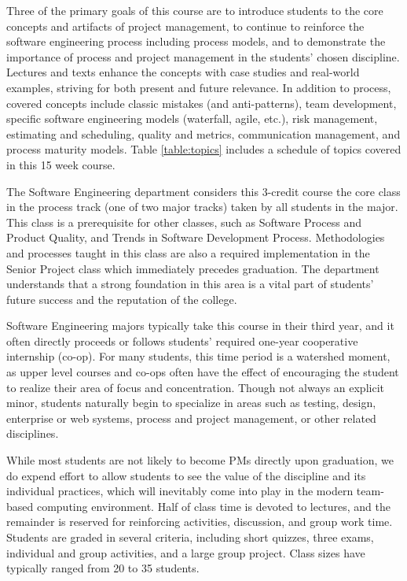 \documentclass{sig-alternate}
\begin{document}
Three of the primary goals of this course are to introduce students to the core concepts and artifacts of
project management, to continue to reinforce the software engineering process including process models,
and to demonstrate the importance of process and project management in the students' chosen discipline.
Lectures and texts enhance the concepts with case studies and real-world examples, striving for both
present and future relevance. In addition to process, covered concepts include classic mistakes (and
anti-patterns), team development, specific software engineering models (waterfall, agile, etc.), risk
management, estimating and scheduling, quality and metrics, communication management, and process
maturity models. Table \ref{table:topics} includes a schedule of topics covered in this 15 week course.

The Software Engineering department considers this 3-credit course the core class in the process track
(one of two major tracks) taken by all students in the major. This class is a prerequisite for other classes,
such as Software Process and Product Quality, and Trends in Software Development Process.
Methodologies and processes taught in this class are also a required implementation in the Senior Project
class which immediately precedes graduation. The department understands that a strong foundation in
this area is a vital part of students' future success and the reputation of the college.

Software Engineering majors typically take this course in their third year, and it often directly
proceeds or follows students' required one-year cooperative internship (co-op). For many students, this
time period is a watershed moment, as upper level courses and co-ops often have the effect of
encouraging the student to realize their area of focus and concentration. Though not always an explicit
minor, students naturally begin to specialize in areas such as testing, design, enterprise or web systems,
process and project management, or other related disciplines.

While most students are not likely to become PMs directly upon graduation, we do expend effort to allow students to see the value of
the discipline and its individual practices, which will inevitably come into play in the modern team-based computing environment. Half of class time is devoted to lectures, and the
remainder is reserved for reinforcing activities, discussion, and group work time. Students are graded in
several criteria, including short quizzes, three exams, individual and group activities, and a large group
project. Class sizes have typically ranged from 20 to 35 students.
\end{document}
